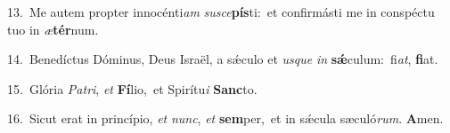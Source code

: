 {\numbfont\textcolor{\numbcolor}{13.}}~Me autem propter innocénti\textit{am} \textit{su}\-\textit{sce}\textbf{pís}ti:~\star et confirmásti me in conspéctu tuo in \textit{æ}\-\textbf{tér}num.\par
{\numbfont\textcolor{\numbcolor}{14.}}~Benedíctus Dóminus, Deus Israël, a sǽculo et \textit{us}\-\textit{que} \textit{in} \textbf{sǽ}\-culum:~\star fi\-\textit{at}\-, \textbf{fi}\-at.\par
{\numbfont\textcolor{\numbcolor}{15.}}~Glória \textit{Pa}\-\textit{tri}, \textit{et} \textbf{Fí}\-lio,~\star et Spirítu\textit{i} \textbf{Sanc}\-to.\par
{\numbfont\textcolor{\numbcolor}{16.}}~Sicut erat in princípio, \textit{et} \textit{nunc}\-, \textit{et} \textbf{sem}\-per,~\star et in sǽcula sæculó\-\textit{rum}\-. \textbf{A}\-men.\par
